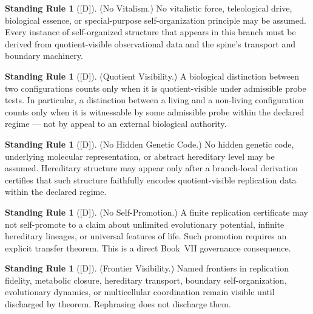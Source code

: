 \documentclass[12pt,oneside]{amsbook}
\theoremstyle{plain}
\theoremstyle{definition}
\newtheorem{standingrule}[theorem]{Standing Rule}
\theoremstyle{remark}
\newcommand{\status}[1]{\textup{[#1]}}
\begin{document}
\begin{standingrule}[\status{D}]\label{sr:bio-no-vitalism}
\textup{(No Vitalism.)}
No vitalistic force, teleological drive, biological essence, or
special-purpose self-organization principle may be assumed. Every
instance of self-organized structure that appears in this branch must
be derived from quotient-visible observational data and the spine's
transport and boundary machinery.
\end{standingrule}

\begin{standingrule}[\status{D}]\label{sr:bio-quotient-visible}
\textup{(Quotient Visibility.)}
A biological distinction between two configurations counts only when
it is quotient-visible under admissible probe tests. In particular,
a distinction between a living and a non-living configuration counts
only when it is witnessable by some admissible probe within the
declared regime --- not by appeal to an external biological authority.
\end{standingrule}

\begin{standingrule}[\status{D}]\label{sr:bio-no-hidden-gene}
\textup{(No Hidden Genetic Code.)}
No hidden genetic code, underlying molecular representation, or
abstract hereditary level may be assumed. Hereditary structure may
appear only after a branch-local derivation certifies that such
structure faithfully encodes quotient-visible replication data within
the declared regime.
\end{standingrule}

\begin{standingrule}[\status{D}]\label{sr:bio-no-self-promotion}
\textup{(No Self-Promotion.)}
A finite replication certificate may not self-promote to a claim about
unlimited evolutionary potential, infinite hereditary lineages, or
universal features of life. Such promotion requires an explicit
transfer theorem. This is a direct Book~VII governance consequence.
\end{standingrule}

\begin{standingrule}[\status{D}]\label{sr:bio-frontier-visibility}
\textup{(Frontier Visibility.)}
Named frontiers in replication fidelity, metabolic closure, hereditary
transport, boundary self-organization, evolutionary dynamics, or
multicellular coordination remain visible until discharged by theorem.
Rephrasing does not discharge them.
\end{standingrule}
\end{document}
